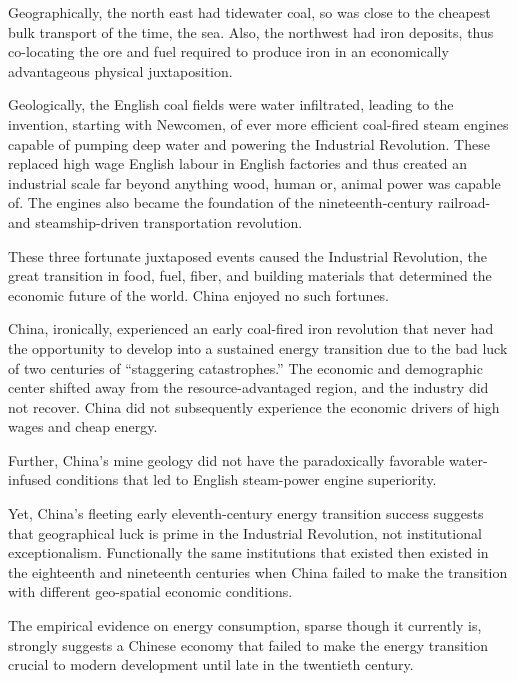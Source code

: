 \documentclass[12pt]{article}
\numberwithin{equation}{section}
\begin{document}
	Geographically, the north east had tidewater coal, so was close to the cheapest bulk transport of the time, the sea. Also, the northwest had iron deposits, thus co-locating the ore and fuel required to produce iron in an economically advantageous physical juxtaposition. 
	
	Geologically, the English coal fields were water infiltrated, leading to the invention, starting with Newcomen, of ever more efficient coal-fired steam engines capable of pumping deep water and powering the Industrial Revolution. These replaced high wage English labour in English factories and thus created an industrial scale far beyond anything wood, human or, animal power was capable of. The engines also became the foundation of the nineteenth-century railroad- and steamship-driven transportation revolution.
	
	These three fortunate juxtaposed events caused the Industrial Revolution, the great transition in food, fuel, fiber, and building materials that determined the economic future of the world. China enjoyed no such fortunes.
	
	China, ironically, experienced an early coal-fired iron revolution that never had the opportunity to develop into a sustained energy transition due to the bad luck of two centuries of ``staggering catastrophes.'' The economic and demographic center shifted away from the resource-advantaged region, and the industry did not recover. China did not subsequently experience the economic drivers of high wages and cheap energy.
	
	Further, China's mine geology did not have the paradoxically favorable water-infused conditions that led to English steam-power engine superiority.
	
	Yet, China's fleeting early eleventh-century energy transition success suggests that geographical luck is prime in the Industrial Revolution, not institutional exceptionalism. Functionally the same institutions that existed then existed in the eighteenth and nineteenth centuries when China failed to make the transition with different geo-spatial economic conditions.
	
	The empirical evidence on energy consumption, sparse though it currently is, strongly suggests a Chinese economy that failed to make the energy transition crucial to modern development until late in the twentieth century.
\end{document}
